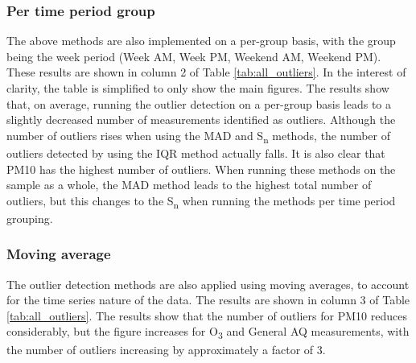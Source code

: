 \documentclass[11pt]{report}
\begin{document}
\subsubsection{Per time period group}

The above methods are also implemented on a per-group basis, with the group being the week period (Week AM, Week PM, Weekend AM, Weekend PM). These results are shown in column 2 of Table \ref{tab:all_outliers}. In the interest of clarity, the table is simplified to only show the main figures. The results show that, on average, running the outlier detection on a per-group basis leads to a slightly decreased number of measurements identified as outliers. Although the number of outliers rises when using the MAD and S\textsubscript{n} methods, the number of outliers detected by using the IQR method actually falls. It is also clear that PM10 has the highest number of outliers. When running these methods on the sample as a whole, the MAD method leads to the highest total number of outliers, but this changes to the S\textsubscript{n} when running the methods per time period grouping.

\subsubsection{Moving average}

The outlier detection methods are also applied using moving averages, to account for the time series nature of the data. The results are shown in column 3 of Table \ref{tab:all_outliers}. The results show that the number of outliers for PM10 reduces considerably, but the figure increases for O\textsubscript{3} and General AQ measurements, with the number of outliers increasing by approximately a factor of 3.
\end{document}
